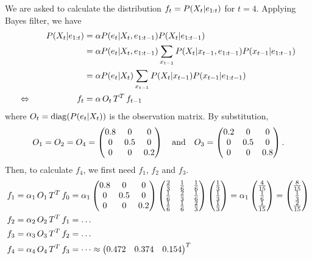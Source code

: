 \documentclass[11pt, a4paper]{article}
\begin{document}
\begin{enumerate}
    \begin{solution}
        We are asked to calculate the distribution $f_t = P(X_t \vert e_{1:t})$ for $t = 4$. Applying Bayes filter, we have
        \begin{alignat*}{2}
            && P(X_t \vert e_{1:t}) & = \alpha P(e_t \vert X_t, e_{1:t-1}) P(X_t \vert e_{1:t-1}) \\
            &&& = \alpha P(e_t \vert X_t, e_{1:t-1}) \sum_{x_{t-1}} P(X_t \vert x_{t-1}, e_{1:t-1}) P(x_{t-1} \vert e_{1:t-1}) \\
            &&& = \alpha P(e_t \vert X_t) \sum_{x_{t-1}} P(X_t \vert x_{t-1}) P(x_{t-1} \vert e_{1:t-1}) \\
            \Leftrightarrow \quad && f_t & = \alpha \, O_t \, T^T \, f_{t-1}
        \end{alignat*}
        where $O_t = \operatorname{diag}(P(e_t \vert X_t))$ is the observation matrix. By substitution,
        \begin{equation*}
                O_1 = O_2 = O_4 = \begin{pmatrix}0.8 & 0 & 0 \\ 0 & 0.5 & 0 \\ 0 & 0 & 0.2\end{pmatrix} \quad \text{and} \quad O_3 = \begin{pmatrix}0.2 & 0 & 0 \\ 0 & 0.5 & 0 \\ 0 & 0 & 0.8\end{pmatrix} .
        \end{equation*}
        Then, to calculate $f_4$, we first need $f_1$, $f_2$ and $f_3$.
        \begin{align*}
            f_1 & = \alpha_1 \, O_1 \, T^T \, f_0 = \alpha_1 \begin{pmatrix}0.8 & 0 & 0 \\ 0 & 0.5 & 0 \\ 0 & 0 & 0.2\end{pmatrix} \begin{pmatrix}
                \frac{2}{3} & \frac{1}{6} & \frac{1}{6} \\
                \frac{1}{6} & \frac{2}{3} & \frac{1}{6} \\
                \frac{1}{6} & \frac{1}{6} & \frac{2}{3}
            \end{pmatrix} \begin{pmatrix}\frac{1}{3} \\ \frac{1}{3} \\ \frac{1}{3}\end{pmatrix} = \alpha_1 \begin{pmatrix}\frac{4}{15} \\ \frac{1}{6} \\ \frac{1}{15}\end{pmatrix} = \begin{pmatrix}\frac{8}{15} \\ \frac{1}{3} \\ \frac{2}{15}\end{pmatrix} \\
            f_2 & = \alpha_2 \, O_2 \, T^T \, f_1 = \dots \\
            f_3 & = \alpha_3 \, O_3 \, T^T \, f_2 = \dots \\
            f_4 & = \alpha_4 \, O_4 \, T^T \, f_3 = \dots \approx \begin{pmatrix}0.472 & 0.374 & 0.154\end{pmatrix}^T
        \end{align*}
    \end{solution}


\end{enumerate}
\end{document}
